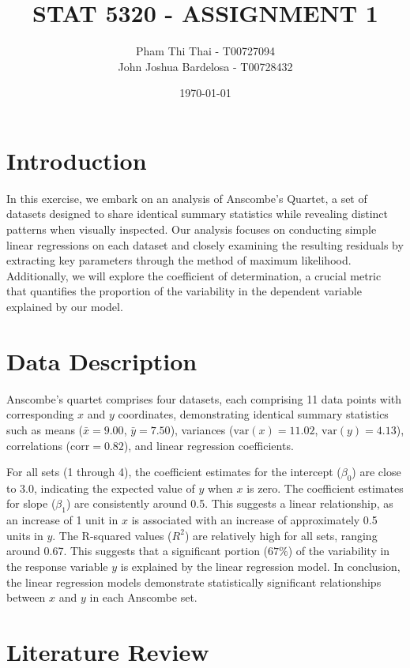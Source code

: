 \documentclass[12pt,doublespace]{article}
\begin{document}
	\title{ STAT 5320 - ASSIGNMENT 1}
	\author{Pham Thi Thai - T00727094
			\\
			John Joshua Bardelosa - T00728432}
	\date{\today}
	\maketitle
	
	\section{Introduction}
	In this exercise, we embark on an analysis of Anscombe's Quartet, a set of datasets designed to share identical summary statistics while revealing distinct patterns when visually inspected. Our analysis focuses on conducting simple linear regressions on each dataset and closely examining the resulting residuals by extracting key parameters through the method of maximum likelihood. Additionally, we will explore the coefficient of determination, a crucial metric that quantifies the proportion of the variability in the dependent variable explained by our model. 

	\section{Data Description}
	Anscombe's quartet comprises four datasets, each comprising 11 data points with corresponding \(x\) and \(y\) coordinates, demonstrating identical summary statistics
	such as means (\(\bar{x} = 9.00\), \(\bar{y} = 7.50\)), variances (\(\text{var}(x) = 11.02\), \(\text{var}(y) = 4.13\)), correlations (\(\text{corr} = 0.82\)), and linear regression coefficients. 
	
	For all sets (1 through 4), the coefficient estimates for the intercept (\(\beta_{0}\)) are close to 3.0, indicating the expected value of \(y\) when \(x\) is zero. The coefficient estimates for slope (\(\beta_{1}\)) are consistently around 0.5. This suggests a linear relationship, as an increase of 1 unit in \(x\) is associated with an increase of approximately 0.5 units in \(y\). The R-squared values (\(R^{2}\)) are relatively high for all sets, ranging around 0.67. This suggests that a significant portion (\(\text{67\%}\)) of the variability in the response variable \(y\) is explained by the linear regression model. In conclusion, the linear regression models demonstrate statistically significant relationships between \(x\) and \(y\) in each Anscombe set.
	
	\section{Literature Review}
\end{document}
